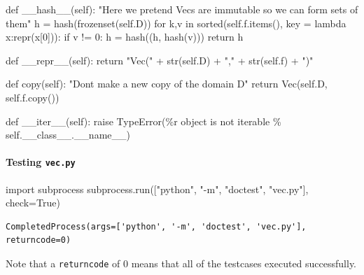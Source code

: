 \documentclass[
  letterpaper,
  DIV=11,
  numbers=noendperiod]{scrartcl}
\let\oldparagraph\paragraph
\renewcommand{\paragraph}[1]{\oldparagraph{#1}\mbox{}}
\newenvironment{Shaded}{\begin{snugshade}}{\end{snugshade}}
\newcommand{\BuiltInTok}[1]{\textcolor[rgb]{0.00,0.23,0.31}{#1}}
\newcommand{\CommentTok}[1]{\textcolor[rgb]{0.37,0.37,0.37}{#1}}
\newcommand{\ControlFlowTok}[1]{\textcolor[rgb]{0.00,0.23,0.31}{#1}}
\newcommand{\DecValTok}[1]{\textcolor[rgb]{0.68,0.00,0.00}{#1}}
\newcommand{\FunctionTok}[1]{\textcolor[rgb]{0.28,0.35,0.67}{#1}}
\newcommand{\ImportTok}[1]{\textcolor[rgb]{0.00,0.46,0.62}{#1}}
\newcommand{\KeywordTok}[1]{\textcolor[rgb]{0.00,0.23,0.31}{#1}}
\newcommand{\NormalTok}[1]{\textcolor[rgb]{0.00,0.23,0.31}{#1}}
\newcommand{\OperatorTok}[1]{\textcolor[rgb]{0.37,0.37,0.37}{#1}}
\newcommand{\PreprocessorTok}[1]{\textcolor[rgb]{0.68,0.00,0.00}{#1}}
\newcommand{\SpecialCharTok}[1]{\textcolor[rgb]{0.37,0.37,0.37}{#1}}
\newcommand{\StringTok}[1]{\textcolor[rgb]{0.13,0.47,0.30}{#1}}
\newcommand{\VariableTok}[1]{\textcolor[rgb]{0.07,0.07,0.07}{#1}}
\begin{document}
\begin{Shaded}
\begin{Highlighting}[numbers=left,,]
    \KeywordTok{def} \FunctionTok{\_\_hash\_\_}\NormalTok{(}\VariableTok{self}\NormalTok{):}
        \CommentTok{"Here we pretend Vecs are immutable so we can form sets of them"}
\NormalTok{        h }\OperatorTok{=} \BuiltInTok{hash}\NormalTok{(}\BuiltInTok{frozenset}\NormalTok{(}\VariableTok{self}\NormalTok{.D))}
        \ControlFlowTok{for}\NormalTok{ k,v }\KeywordTok{in} \BuiltInTok{sorted}\NormalTok{(}\VariableTok{self}\NormalTok{.f.items(), key }\OperatorTok{=} \KeywordTok{lambda}\NormalTok{ x:}\BuiltInTok{repr}\NormalTok{(x[}\DecValTok{0}\NormalTok{])):}
            \ControlFlowTok{if}\NormalTok{ v }\OperatorTok{!=} \DecValTok{0}\NormalTok{:}
\NormalTok{                h }\OperatorTok{=} \BuiltInTok{hash}\NormalTok{((h, }\BuiltInTok{hash}\NormalTok{(v)))}
        \ControlFlowTok{return}\NormalTok{ h}

    \KeywordTok{def} \FunctionTok{\_\_repr\_\_}\NormalTok{(}\VariableTok{self}\NormalTok{):}
        \ControlFlowTok{return} \StringTok{"Vec("} \OperatorTok{+} \BuiltInTok{str}\NormalTok{(}\VariableTok{self}\NormalTok{.D) }\OperatorTok{+} \StringTok{","} \OperatorTok{+} \BuiltInTok{str}\NormalTok{(}\VariableTok{self}\NormalTok{.f) }\OperatorTok{+} \StringTok{")"}

    \KeywordTok{def}\NormalTok{ copy(}\VariableTok{self}\NormalTok{):}
        \CommentTok{"Don\textquotesingle{}t make a new copy of the domain D"}
        \ControlFlowTok{return}\NormalTok{ Vec(}\VariableTok{self}\NormalTok{.D, }\VariableTok{self}\NormalTok{.f.copy())}

    \KeywordTok{def} \FunctionTok{\_\_iter\_\_}\NormalTok{(}\VariableTok{self}\NormalTok{):}
        \ControlFlowTok{raise} \PreprocessorTok{TypeError}\NormalTok{(}\StringTok{\textquotesingle{}}\SpecialCharTok{\%r}\StringTok{ object is not iterable\textquotesingle{}} \OperatorTok{\%} \VariableTok{self}\NormalTok{.\_\_class\_\_.}\VariableTok{\_\_name\_\_}\NormalTok{)}
\end{Highlighting}
\end{Shaded}

\hypertarget{testing-vec.py}{%
\paragraph{\texorpdfstring{Testing
\texttt{vec.py}}{Testing vec.py}}\label{testing-vec.py}}

\begin{Shaded}
\begin{Highlighting}[numbers=left,,]
\ImportTok{import}\NormalTok{ subprocess}
\NormalTok{subprocess.run([}\StringTok{"python"}\NormalTok{, }\StringTok{"{-}m"}\NormalTok{, }\StringTok{"doctest"}\NormalTok{, }\StringTok{"vec.py"}\NormalTok{], check}\OperatorTok{=}\VariableTok{True}\NormalTok{)}
\end{Highlighting}
\end{Shaded}

\begin{verbatim}
CompletedProcess(args=['python', '-m', 'doctest', 'vec.py'], returncode=0)
\end{verbatim}

Note that a \texttt{returncode} of 0 means that all of the testcases
executed successfully.
\end{document}
